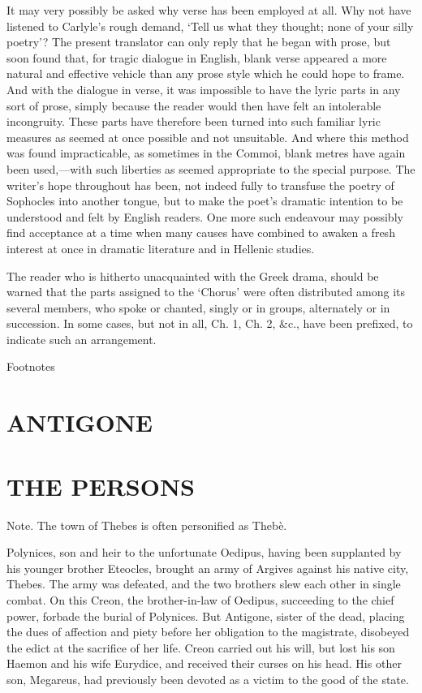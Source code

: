 \documentclass[11pt,letter]{book}
\begin{document}
\par  It may very possibly be asked why verse has been employed at all. Why not have listened to Carlyle’s rough demand, ‘Tell us what they thought; none of your silly poetry’? The present translator can only reply that he began with prose, but soon found that, for tragic dialogue in English, blank verse appeared a more natural and effective vehicle than any prose style which he could hope to frame. And with the dialogue in verse, it was impossible to have the lyric parts in any sort of prose, simply because the reader would then have felt an intolerable incongruity. These parts have therefore been turned into such familiar lyric measures as seemed at once possible and not unsuitable. And where this method was found impracticable, as sometimes in the Commoi, blank metres have again been used,—with such liberties as seemed appropriate to the special purpose. The writer’s hope throughout has been, not indeed fully to transfuse the poetry of Sophocles into another tongue, but to make the poet’s dramatic intention to be understood and felt by English readers. One more such endeavour may possibly find acceptance at a time when many causes have combined to awaken a fresh interest at once in dramatic literature and in Hellenic studies.

\par  The reader who is hitherto unacquainted with the Greek drama, should be warned that the parts assigned to the ‘Chorus’ were often distributed among its several members, who spoke or chanted, singly or in groups, alternately or in succession. In some cases, but not in all, Ch. 1, Ch. 2, &c., have been prefixed, to indicate such an arrangement.

\par  Footnotes
   \section{ANTIGONE}\section{THE PERSONS} 
\par  Note. The town of Thebes is often personified as Thebè.

\par  [page 2] Polynices, son and heir to the unfortunate Oedipus, having been supplanted by his younger brother Eteocles, brought an army of Argives against his native city, Thebes. The army was defeated, and the two brothers slew each other in single combat. On this Creon, the brother-in-law of Oedipus, succeeding to the chief power, forbade the burial of Polynices. But Antigone, sister of the dead, placing the dues of affection and piety before her obligation to the magistrate, disobeyed the edict at the sacrifice of her life. Creon carried out his will, but lost his son Haemon and his wife Eurydice, and received their curses on his head. His other son, Megareus, had previously been devoted as a victim to the good of the state.
\end{document}
